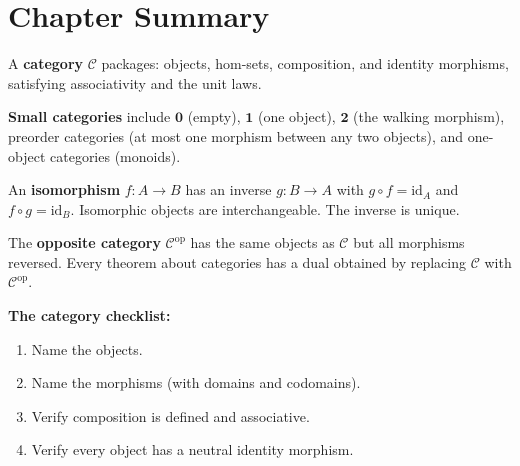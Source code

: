 \begin{exercisesbox}
\begin{qa}
\end{qa}
\end{exercisesbox}


\section*{Chapter Summary}

\begin{summarybox}
A \textbf{category} $\mathcal{C}$ packages: objects, hom-sets, composition,
and identity morphisms, satisfying associativity and the unit laws.

\textbf{Small categories} include $\mathbf{0}$ (empty), $\mathbf{1}$ (one
object), $\mathbf{2}$ (the walking morphism), preorder categories (at most
one morphism between any two objects), and one-object categories (monoids).

An \textbf{isomorphism} $f : A \to B$ has an inverse $g : B \to A$ with
$g \circ f = \mathrm{id}_A$ and $f \circ g = \mathrm{id}_B$. Isomorphic
objects are interchangeable. The inverse is unique.

The \textbf{opposite category} $\mathcal{C}^{\mathrm{op}}$ has the same
objects as $\mathcal{C}$ but all morphisms reversed. Every theorem about
categories has a dual obtained by replacing $\mathcal{C}$ with
$\mathcal{C}^{\mathrm{op}}$.

\medskip
\textbf{The category checklist:}
\begin{enumerate}
  \item Name the objects.
  \item Name the morphisms (with domains and codomains).
  \item Verify composition is defined and associative.
  \item Verify every object has a neutral identity morphism.
\end{enumerate}
\end{summarybox}

